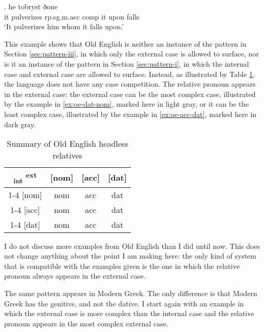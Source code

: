 \exg. he tobryst ðone    \\
 it pulverizes\scsub{[acc]} \ac{rp}.\ac{sg}.\ac{m}.\ac{acc} \ac{comp} it upon\scsub{[dat]} falls\\
`It pulverizes him whom it falls upon.'  \label{ex:oe-acc-dat}

This example shows that Old English is neither an instance of the pattern in Section \ref{sec:pattern-iii}, in which only the external case is allowed to surface, nor is it an instance of the pattern in Section \ref{sec:pattern-i}, in which the internal case and external case are allowed to surface.
Instead, as illustrated by Table \ref{tbl:no-case-competition-old-english}, the language does not have any case competition. The relative pronoun appears in the external case: the external case can be the most complex case, illustrated by the example in \ref{ex:oe-dat-nom}, marked here in light gray, or it can be the least complex case, illustrated by the example in \ref{ex:oe-acc-dat}, marked here in dark gray.

\begin{table}[ht]
  \center
  \caption{Summary of Old English headless relatives}
  \begin{tabular}{c|c|c|c}
    \toprule
   \textsubscript{\ac{int}} \textsuperscript{\ac{ext}}
          & [\ac{nom}]
          & [\ac{acc}]
          & [\ac{dat}]
          \\ \cmidrule{1-4}
      [\ac{nom}]
          & \ac{nom}
          & \ac{acc}
          & \cellcolor{LG}\ac{dat}
          \\ \cmidrule{1-4}
      [\ac{acc}]
          & \ac{nom}
          & \ac{acc}
          & \ac{dat}
          \\ \cmidrule{1-4}
      [\ac{dat}]
          & \ac{nom}
          & \cellcolor{DG}\ac{acc}
          & \ac{dat}
          \\
    \bottomrule
  \end{tabular}
  \label{tbl:no-case-competition-old-english}
\end{table}

I do not discuss more examples from Old English than I did until now. This does not change anything about the point I am making here: the only kind of system that is compatible with the examples given is the one in which the relative pronoun always appears in the external case.

The same pattern appears in Modern Greek. The only difference is that Modern Greek has the genitive, and not the dative. I start again with an example in which the external case is more complex than the internal case and the relative pronoun appears in the most complex external case.


